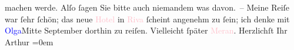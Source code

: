                machen werde. Alſo ſagen Sie bitte auch niemandem was davon. –\pend
           \pstart
           Meine Reiſe war ſehr ſchön; das neue \textcolor{pink}{Hotel}{} in \textcolor{pink}{Riva}{}\ledrightnote{\textcolor{pink}{Riva del Garda}} ſcheint angenehm zu ſein; ich
               denke {\pb}mit \textcolor{blue}{Olga}{}\ledrightnote{\textcolor{blue}{Olga Schnitzler}}{ }Mitte September dorthin zu reiſen. Vielleicht ſpäter \textcolor{pink}{Meran}{}\ledrightnote{\textcolor{pink}{Meran}}.\pend
           \pstart
           Herzlichſt Ihr{\\[\baselineskip]}\spacefill\mbox{Arthur}\pend
           \leftskip=0em{}\endnumbering{}  
      